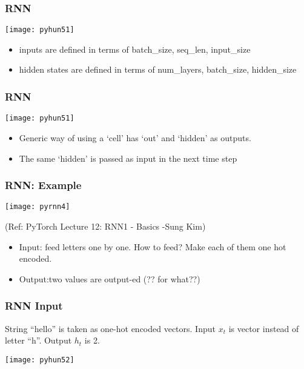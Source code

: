 \begin{frame}[fragile] \frametitle{RNN}
\begin{center}
\texttt{[image: pyhun51]}
\end{center}
\begin{itemize}
\item inputs are defined in terms of batch\_size, seq\_len, input\_size
\item  hidden states are defined in terms of num\_layers, batch\_size, hidden\_size
\end{itemize}
\end{frame}

\begin{frame}[fragile] \frametitle{RNN}
\begin{center}
\texttt{[image: pyhun51]}
\end{center}
\begin{itemize}
\item Generic way of using a `cell' has `out' and `hidden' as outputs.
\item The same `hidden' is passed as input in the next time step
\end{itemize}
\end{frame}

\begin{frame}[fragile] \frametitle{RNN: Example}
\begin{center}
\texttt{[image: pyrnn4]}

\tiny{(Ref: PyTorch Lecture 12: RNN1 - Basics -Sung Kim)}
\end{center}
\begin{itemize}
\item Input: feed letters one by one. How to feed? Make each of them one hot encoded.
\item Output:two values are output-ed (?? for what??)
\end{itemize}
\end{frame}


\begin{frame}[fragile] \frametitle{RNN Input}

String ``hello'' is taken as one-hot encoded vectors. Input $x_t$ is vector instead of letter ``h''. Output $h_t$ is 2.
\begin{center}
\texttt{[image: pyhun52]}
\end{center}
\end{frame}



